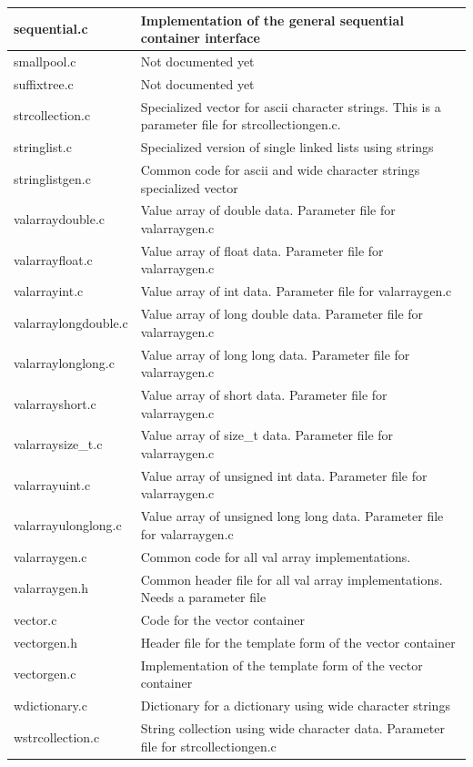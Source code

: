 \documentclass[12pt,a4paper,openany]{memoir} %
\begin{document}
{{{\begin{longtable}{||p{3.5cm}|p{11cm}||}
sequential.c&Implementation of the general sequential container interface\\\hline
smallpool.c&Not documented yet\\\hline
suffixtree.c&Not documented yet\\\hline
strcollection.c&Specialized vector for ascii character strings. This is a parameter file for strcollectiongen.c.\\\hline
stringlist.c&Specialized version of single linked lists using strings\\\hline
stringlistgen.c&Common code for ascii and wide character strings specialized vector\\\hline
valarraydouble.c&Value array of double data. Parameter file for valarraygen.c\\\hline
valarrayfloat.c&Value array of float data. Parameter file for valarraygen.c\\\hline
valarrayint.c&Value array of int data. Parameter file for valarraygen.c\\\hline
valarraylongdouble.c&Value array of long double data. Parameter file for valarraygen.c\\\hline
valarraylonglong.c&Value array of long long data. Parameter file for valarraygen.c\\\hline
valarrayshort.c&Value array of short data. Parameter file for valarraygen.c\\\hline
valarraysize\_t.c&Value array of size\_t data. Parameter file for valarraygen.c\\\hline
valarrayuint.c&Value array of unsigned int data. Parameter file for valarraygen.c\\\hline
valarrayulonglong.c&Value array of unsigned long long data. Parameter file for valarraygen.c\\\hline
valarraygen.c&Common code for all val array implementations.\\\hline
valarraygen.h&Common header file for all val array implementations. Needs a parameter file\\\hline
vector.c&Code for the vector container\\\hline
vectorgen.h&Header file for the template form of the vector container\\\hline
vectorgen.c&Implementation of the template form of the vector container\\\hline
wdictionary.c&Dictionary for a dictionary using wide character strings\\\hline
wstrcollection.c&String collection using wide character data. Parameter file for strcollectiongen.c\\\hline \hline
\end{longtable}

}}}
\end{document}
